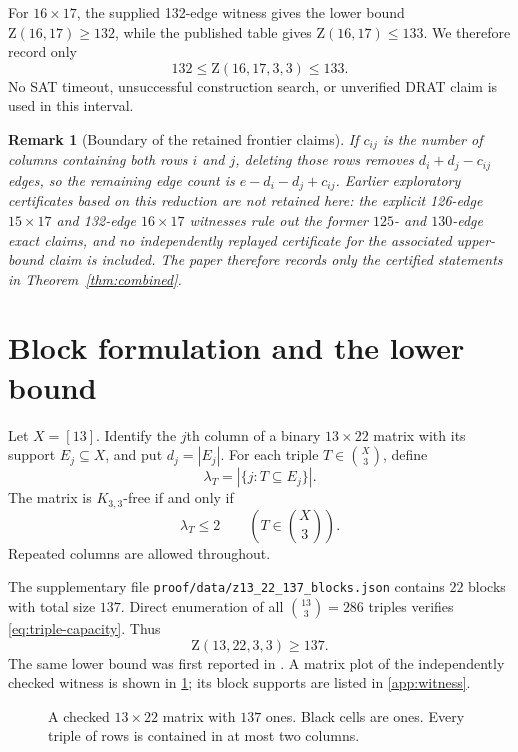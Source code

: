 \documentclass[11pt]{amsart}
\newtheorem{remark}[theorem]{Remark}
\newcommand{\Z}{\mathrm Z}
\begin{document}
For $16\times17$, the supplied 132-edge witness gives the lower bound
$\Z(16,17)\ge132$, while the published table gives $\Z(16,17)\le133$.
We therefore record only
\[
  132\le\Z(16,17,3,3)\le133.
\]
No SAT timeout, unsuccessful construction search, or unverified DRAT claim
is used in this interval.

\begin{remark}[Boundary of the retained frontier claims]
If $c_{ij}$ is the number of columns containing both rows $i$ and $j$,
deleting those rows removes $d_i+d_j-c_{ij}$ edges, so the remaining edge
count is $e-d_i-d_j+c_{ij}$. Earlier exploratory certificates based on this
reduction are not retained here: the explicit 126-edge $15\times17$ and
132-edge $16\times17$ witnesses rule out the former $125$- and $130$-edge
exact claims, and no independently replayed certificate for the associated
upper-bound claim is included. The paper therefore records only the certified
statements in Theorem~\ref{thm:combined}.
\end{remark}

\section{Block formulation and the lower bound}
Let $X=[13]$. Identify the $j$th column of a binary $13\times22$ matrix with its support $E_j\subseteq X$, and put $d_j=|E_j|$. For each triple $T\in\binom{X}{3}$, define
\[
  \lambda_T=|\{j:T\subseteq E_j\}|.
\]
The matrix is $K_{3,3}$-free if and only if
\begin{equation}\label{eq:triple-capacity}
  \lambda_T\le2 \qquad(T\in\binom{X}{3}).
\end{equation}
Repeated columns are allowed throughout.

The supplementary file \texttt{proof/data/z13\_22\_137\_blocks.json} contains $22$ blocks with total size $137$. Direct enumeration of all $\binom{13}{3}=286$ triples verifies \eqref{eq:triple-capacity}. Thus
\begin{equation}\label{eq:lower}
  \Z(13,22,3,3)\ge137.
\end{equation}
The same lower bound was first reported in \cite{BhanNobiliLanger2026}. A matrix plot of the independently checked witness is shown in \cref{fig:witness}; its block supports are listed in \cref{app:witness}.

\begin{figure}[ht]
\centering
\resizebox{0.92\textwidth}{!}{}
\caption{A checked $13\times22$ matrix with $137$ ones. Black cells are ones. Every triple of rows is contained in at most two columns.}
\label{fig:witness}
\end{figure}
\end{document}
